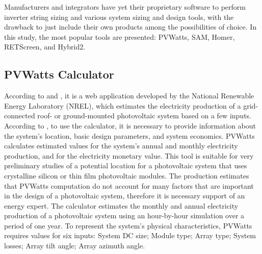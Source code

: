 \documentclass[journal]{IEEEtran}
\begin{document}
Manufacturers and integrators have yet their proprietary software to perform inverter string sizing and various system sizing and design tools, with the drawback to just include their own products among the possibilities of choice. 
In this study, the most popular tools are presented: PVWatts, SAM, Homer, RETScreen, and Hybrid2.

\subsection{PVWatts Calculator}
According to \cite{Freeman} and \cite{NRELDobos}, it is a web application developed by the National Renewable Energy Laboratory (NREL), which estimates the electricity production of a grid-connected roof- or ground-mounted photovoltaic system based on a few inputs. According to \cite{NRELDobos}, to use the calculator, it is necessary to provide information about the system's location, basic design parameters, and system economics. PVWatts calculates estimated values for the system's annual and monthly electricity production, and for the electricity monetary value. This tool is suitable for very preliminary studies of a potential location for a photovoltaic system that uses crystalline silicon or thin film photovoltaic modules. The production estimates that PVWatts computation do not account for many factors that are important in the design of a photovoltaic system, therefore it is necessary support of an energy expert. The calculator estimates the monthly and annual electricity production of a photovoltaic system using an hour-by-hour simulation over a period of one year. To represent the system's physical characteristics, PVWatts requires values for six inputs: System DC size; Module type; Array type; System losses; Array tilt angle; Array azimuth angle.
\end{document}
